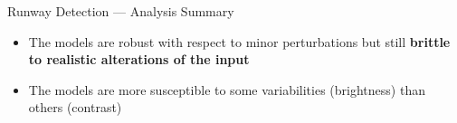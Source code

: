 \documentclass[10pt]{beamer}
\begin{document}
\begin{frame}{Runway Detection --- Analysis Summary}
\begin{itemize}
    \item The models are robust with respect to minor perturbations but still
        {\bf brittle to realistic alterations of the input}
\item The models are more susceptible to some variabilities (brightness) than
others (contrast)
\end{itemize}
\begin{figure}
    \end{figure}

\end{frame}


\end{document}
